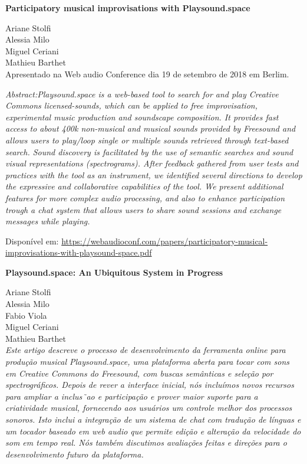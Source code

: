 \textbf{Participatory musical improvisations with Playsound.space}

Ariane Stolfi \\ 
Alessia Milo \\
Miguel Ceriani \\
Mathieu Barthet \\

Apresentado na Web audio Conference dia 19 de setembro de 2018 em Berlim.

\textit{Abstract:Playsound.space is a web-based tool to search for and play Creative Commons licensed-sounds, which can be applied to free improvisation, experimental music production and soundscape composition. It provides fast access to about 400k non-musical and musical sounds provided by Freesound and allows users to play/loop single or multiple sounds retrieved through text-based search. Sound discovery is facilitated by the use of semantic searches and sound visual representations (spectrograms). After feedback gathered from user tests and practices with the tool as an instrument, we identified several directions to develop the expressive and collaborative capabilities of the tool. We present additional features for more complex audio processing, and also to enhance participation trough a chat system that allows users to share sound sessions and exchange messages while playing.}

Disponível em: \url{https://webaudioconf.com/papers/participatory-musical-improvisations-with-playsound-space.pdf}



\textbf{Playsound.space: An Ubiquitous System in Progress}

Ariane Stolfi \\ 
Alessia Milo \\
Fabio Viola \\
Miguel Ceriani \\
Mathieu Barthet \\


\textit{Este artigo descreve o processo de desenvolvimento da ferramenta online para produção musical Playsound.space, uma plataforma aberta para tocar com sons em Creative Commons do Freesound, com buscas semânticas e seleção por spectrográficos. Depois de rever a interface inicial, nós incluímos novos recursos para ampliar a inclus˜ao e participação e prover maior suporte para a criatividade musical, fornecendo aos usuários um controle melhor dos processos sonoros. Isto inclui a integração de um sistema de chat com tradução de línguas e um tocador baseado em web audio que permite edição e alteração da velocidade do som em tempo real. Nós também discutimos avaliações feitas e direções para o desenvolvimento futuro da plataforma.}

